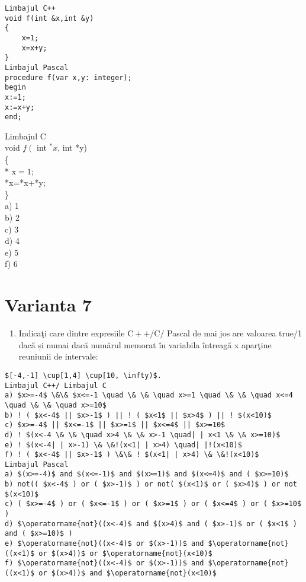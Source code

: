 \begin{verbatim}
Limbajul C++
void f(int &x,int &y)
{
    x=1;
    x=x+y;
}
Limbajul Pascal
procedure f(var x,y: integer);
begin
x:=1;
x:=x+y;
end;
\end{verbatim}

Limbajul C\\
void $f\left(\right.$ int ${ }^{*} x$, int *y)\\
\{\\
* $\mathrm{x}=1$;\\
*x=*x+*y;\\
\}\\
a) 1\\
b) 2\\
c) 3\\
d) 4\\
e) 5\\
f) 6

\section*{Varianta 7}
\begin{enumerate}
  \item Indicaţi care dintre expresiile $\mathrm{C}++/ \mathrm{C} /$ Pascal de mai jos are valoarea true/1 dacă și numai dacă numărul memorat în variabila întreagă x aparţine reuniunii de intervale:
\end{enumerate}

\begin{verbatim}
$[-4,-1] \cup[1,4] \cup[10, \infty)$.
Limbajul C++/ Limbajul C
a) $x>=-4$ \&\& $x<=-1 \quad \& \& \quad x>=1 \quad \& \& \quad x<=4 \quad \& \& \quad x>=10$
b) ! ( $x<-4$ || $x>-1$ ) || ! ( $x<1$ || $x>4$ ) || ! $(x<10)$
c) $x>=-4$ || $x<=-1$ || $x>=1$ || $x<=4$ || $x>=10$
d) ! $(x<-4 \& \& \quad x>4 \& \& x>-1 \quad| | x<1 \& \& x>=10)$
e) ! $(x<-4| | x>-1) \& \&!(x<1| | x>4) \quad| |!(x<10)$
f) ! ( $x<-4$ || $x>-1$ ) \&\& ! $(x<1| | x>4) \& \&!(x<10)$
Limbajul Pascal
a) $(x>=-4)$ and $(x<=-1)$ and $(x>=1)$ and $(x<=4)$ and ( $x>=10)$
b) not(( $x<-4$ ) or ( $x>-1)$ ) or not( $(x<1)$ or ( $x>4)$ ) or not $(x<10)$
c) ( $x>=-4$ ) or ( $x<=-1$ ) or ( $x>=1$ ) or ( $x<=4$ ) or ( $x>=10$ )
d) $\operatorname{not}((x<-4)$ and $(x>4)$ and ( $x>-1)$ or ( $x<1$ ) and ( $x>=10)$ )
e) $\operatorname{not}((x<-4)$ or $(x>-1))$ and $\operatorname{not}((x<1)$ or $(x>4))$ or $\operatorname{not}(x<10)$
f) $\operatorname{not}((x<-4)$ or $(x>-1))$ and $\operatorname{not}((x<1)$ or $(x>4))$ and $\operatorname{not}(x<10)$
\end{verbatim}

